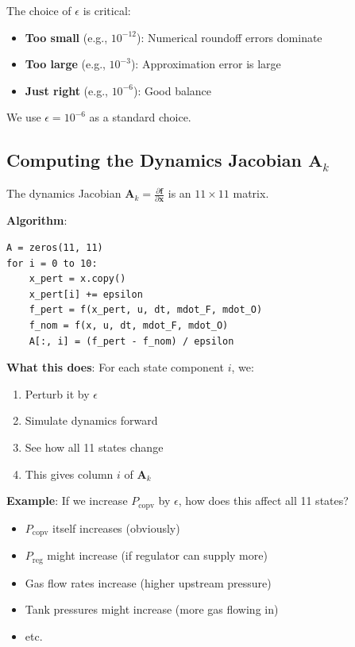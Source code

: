 \documentclass[11pt,a4paper]{article}
\begin{document}
The choice of $\epsilon$ is critical:
\begin{itemize}
    \item \textbf{Too small} (e.g., $10^{-12}$): Numerical roundoff errors dominate
    \item \textbf{Too large} (e.g., $10^{-3}$): Approximation error is large
    \item \textbf{Just right} (e.g., $10^{-6}$): Good balance
\end{itemize}

We use $\epsilon = 10^{-6}$ as a standard choice.

\subsection{Computing the Dynamics Jacobian $\mathbf{A}_k$}

The dynamics Jacobian $\mathbf{A}_k = \frac{\partial \mathbf{f}}{\partial \mathbf{x}}$ is an $11 \times 11$ matrix.

\textbf{Algorithm}:
\begin{verbatim}
A = zeros(11, 11)
for i = 0 to 10:
    x_pert = x.copy()
    x_pert[i] += epsilon
    f_pert = f(x_pert, u, dt, mdot_F, mdot_O)
    f_nom = f(x, u, dt, mdot_F, mdot_O)
    A[:, i] = (f_pert - f_nom) / epsilon
\end{verbatim}

\textbf{What this does}: For each state component $i$, we:
\begin{enumerate}
    \item Perturb it by $\epsilon$
    \item Simulate dynamics forward
    \item See how all 11 states change
    \item This gives column $i$ of $\mathbf{A}_k$
\end{enumerate}

\textbf{Example}: If we increase $P_{\text{copv}}$ by $\epsilon$, how does this affect all 11 states?
\begin{itemize}
    \item $P_{\text{copv}}$ itself increases (obviously)
    \item $P_{\text{reg}}$ might increase (if regulator can supply more)
    \item Gas flow rates increase (higher upstream pressure)
    \item Tank pressures might increase (more gas flowing in)
    \item etc.
\end{itemize}
\end{document}
